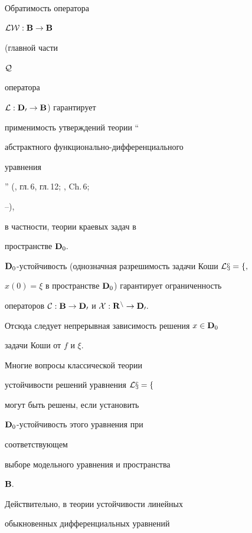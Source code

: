 \begin{note} Обратимость оператора


$\cal L\cal W:\bold B\to\bold B$


(главной части


$\cal Q$


оператора


$\cal L:\bold D_0\to\bold B$) гарантирует


применимость утверждений теории ``{\it


абстрактного функционально-дифференциального


уравнения}'' (\cite{Az1}, гл.\,6, гл.\,12; \cite{Az2}, Ch.\,6;


\cite{Az3}--\cite{Az5}),


в частности, теории краевых задач в


пространстве $\bold D_0.$


\end{note}





\begin{note}


$\bold D_0$-устойчивость (однозначная разрешимость задачи Коши $\cal Lx =f,$


$x(0) = \xi$ в пространстве $\bold D_0$) гарантирует ограниченность


операторов $\cal C:\bold B\to\bold D_0$ и $\cal X:\bold R^n\to\bold D_0.$


Отсюда следует непрерывная зависимость решения $x\in\bold D_0$


задачи Коши от $f$ и $\xi.$


\end{note}








Многие вопросы классической теории


устойчивости решений уравнения $\cal Lx = f$


могут быть решены, если установить


$\bold D_0$-устойчивость этого уравнения при


соответствующем


выборе модельного уравнения и пространства


$\bold B.$


Действительно, в теории устойчивости линейных


обыкновенных дифференциальных уравнений


